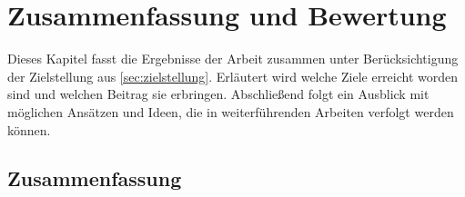 %

\chapter{Zusammenfassung und Bewertung}\label{ch:zusammenfassung-bewertung}


Dieses Kapitel fasst die Ergebnisse der Arbeit zusammen unter Berücksichtigung der Zielstellung aus \autoref{sec:zielstellung}. Erläutert wird welche Ziele erreicht worden sind und welchen Beitrag sie erbringen. Abschließend folgt ein Ausblick mit möglichen Ansätzen und Ideen, die in weiterführenden Arbeiten verfolgt werden können.


\section{Zusammenfassung}\label{sec:zusammenfassung}


